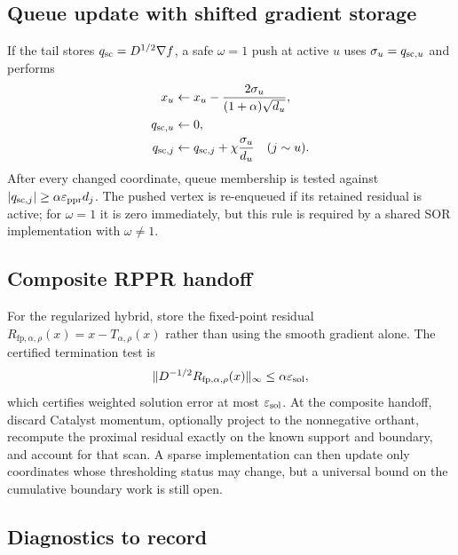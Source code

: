 \subsection{Queue update with shifted gradient storage}

If the tail stores $q_{\rm sc}=D^{1/2}\nabla f$, a safe $\omega=1$ push at
active $u$ uses $\sigma_u=q_{{\rm sc},u}$ and performs
\begin{align}
  x_u&\leftarrow x_u-\frac{2\sigma_u}{(1+\alpha)\sqrt{d_u}},
  \label{eq:implementation-x}\\
  q_{{\rm sc},u}&\leftarrow0,
  \label{eq:implementation-qu}\\
  q_{{\rm sc},j}&\leftarrow q_{{\rm sc},j}+\chi\frac{\sigma_u}{d_u}
  \quad(j\sim u).
  \label{eq:implementation-qv}
\end{align}
After every changed coordinate, queue membership is tested against
$\left\lvert q_{{\rm sc},j} \right\rvert\geq\alpha\varepsilon_{\mathrm{ppr}} d_j$. The pushed vertex is re-enqueued
if its
retained residual is active; for $\omega=1$ it is zero immediately, but this
rule is required by a shared SOR implementation with $\omega\neq1$.

\subsection{Composite RPPR handoff}

For the regularized hybrid, store the fixed-point residual
$R_{\mathrm{fp},\alpha,\rho}(x)=x-T_{\alpha,\rho}(x)$ rather than using the smooth gradient alone.
The certified termination test is
\begin{equation}
  \lVert D^{-1/2}R_{\mathrm{fp},\alpha,\rho}(x)\rVert_\infty
  \leq\alpha\varepsilon_{\mathrm{sol}},
  \label{eq:implementation-rppr-stop}
\end{equation}
which certifies weighted solution error at most $\varepsilon_{\mathrm{sol}}$. At the
composite handoff, discard Catalyst momentum, optionally project to the
nonnegative orthant, recompute the proximal residual exactly on the known
support and boundary, and account for that scan. A sparse implementation can
then update only coordinates whose thresholding status may change, but a
universal bound on the cumulative boundary work is still open.

\subsection{Diagnostics to record}

